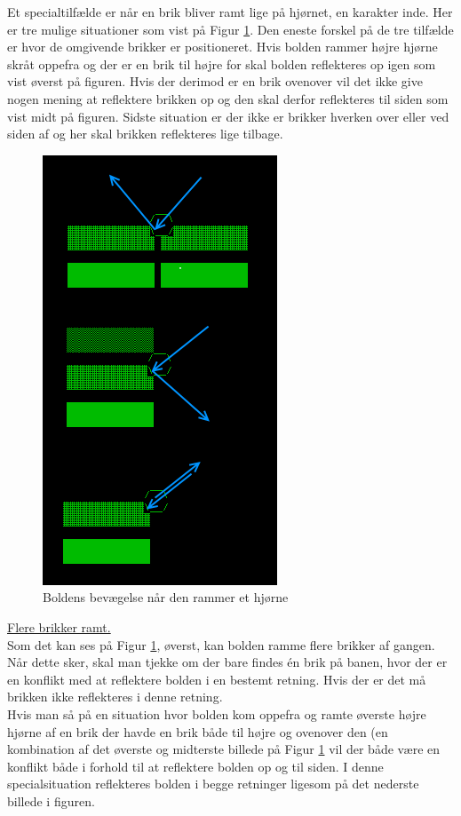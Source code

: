 Et specialtilfælde er når en brik bliver ramt lige på hjørnet, en karakter inde. Her er tre mulige situationer som vist på Figur \ref{fig:cornerReflex}. Den eneste forskel på de tre tilfælde er hvor de omgivende brikker er positioneret. Hvis bolden rammer højre hjørne skråt oppefra og der er en brik til højre for skal bolden reflekteres op igen som vist øverst på figuren. Hvis der derimod er en brik ovenover vil det ikke give nogen mening at reflektere brikken op og den skal derfor reflekteres til siden som vist midt på figuren. Sidste situation er der ikke er brikker hverken over eller ved siden af og her skal brikken reflekteres lige tilbage. 
\begin{figure}[h!]
\center
\includegraphics[scale=0.6]{figs/corner_reflex.png}
\caption{Boldens bevægelse når den rammer et hjørne}
\label{fig:cornerReflex}
\end{figure}

\underline{Flere brikker ramt.}\\

Som det kan ses på Figur \ref{fig:cornerReflex}, øverst, kan bolden ramme flere brikker af gangen. Når dette sker, skal man tjekke om der bare findes én brik på banen, hvor der er en konflikt med at reflektere bolden i en bestemt retning. Hvis der er det må brikken ikke reflekteres i denne retning.\\
Hvis man så på en situation hvor bolden kom oppefra og ramte øverste højre hjørne af en brik der havde en brik både til højre og ovenover den (en kombination af det øverste og midterste billede på Figur \ref{fig:cornerReflex} vil der både være en konflikt både i forhold til at reflektere bolden op og til siden. I denne specialsituation reflekteres bolden i begge retninger ligesom på det nederste billede i figuren.\\
\newpage

